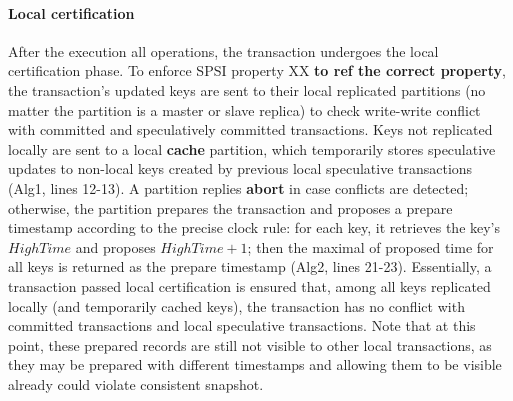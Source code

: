 \paragraph{Local certification} After the execution all operations, the transaction undergoes the local certification phase. To enforce SPSI property XX \textbf{to ref the correct property}, the transaction's updated keys are sent to their local replicated partitions (no matter the partition is a master or slave replica) to check write-write conflict with committed and speculatively committed transactions. Keys not replicated locally are sent to a local \textbf{cache} partition, which temporarily stores speculative updates to non-local keys created by previous local speculative transactions (Alg1, lines 12-13). A partition replies \textbf{abort} in case conflicts are detected; otherwise, the partition prepares the transaction and proposes a prepare timestamp according to the precise clock rule: for each key, it retrieves the key's $HighTime$ and proposes $HighTime+1$; then the maximal of proposed time for all keys is returned as the prepare timestamp (Alg2, lines 21-23). Essentially, a transaction passed local certification is ensured that, among all keys replicated locally (and temporarily cached keys), the transaction has no conflict with committed transactions and local speculative transactions. Note that at this point, these prepared records are still not visible to other local transactions, as they may be prepared with different timestamps and allowing them to be visible already could violate consistent snapshot.

